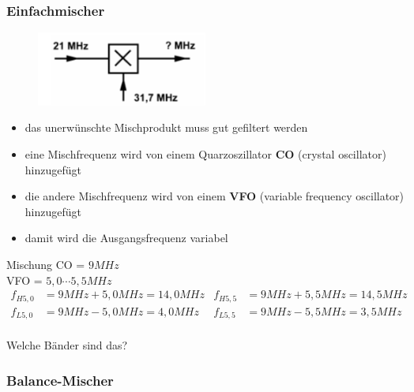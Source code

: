 \begin{frame}
  \frametitle{Einfachmischer}

  \begin{center}
    \begin{figure}
      \includegraphics[width=0.5\textwidth,height=.5\textheight,keepaspectratio]{a13/TG226.png}
    \end{figure}
  \end{center}

  \begin{itemize}
    \item das unerwünschte Mischprodukt muss gut gefiltert werden
    \item eine Mischfrequenz wird von einem Quarzoszillator \textbf{CO} (crystal oscillator) hinzugefügt
    \item die andere Mischfrequenz wird von einem \textbf{VFO} (variable frequency oscillator) hinzugefügt
    \item damit wird die Ausgangsfrequenz variabel
  \end{itemize}
\end{frame}

\begin{frame}
  \begin{exampleblock}{Mischung}
    CO = $9 MHz$\\
    VFO = $5,0\cdots5,5MHz$
    \vspace{2em}
    \pause
    \begin{align*}
      f_{H 5,0} &= 9 MHz + 5,0 MHz = 14,0 MHz & f_{H 5,5} &= 9 MHz + 5,5 MHz = 14,5 MHz \\
      f_{L 5,0} &= 9 MHz - 5,0 MHz = 4,0 MHz  & f_{L 5,5} &= 9 MHz - 5,5 MHz = 3,5 MHz \\
    \end{align*}
  \end{exampleblock}
  \pause
  Welche Bänder sind das?
\end{frame}


\subsubsection{Balance-Mischer}

